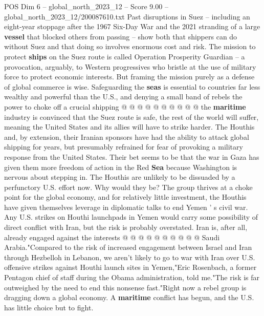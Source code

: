\begin{textsample}{POS Dim 6 – global\_north\_2023\_12 – Score 9.00 – global\_north\_2023\_12/200087610.txt}
Past disruptions in Suez -- including an eight-year stoppage after the 1967 Six-Day War and the 2021 stranding of a large \textbf{vessel} that blocked others from passing -- show both that shippers can do without Suez and that doing so involves enormous cost and risk.
The mission to protect \textbf{ships} on the Suez route is called Operation Prosperity Guardian -- a provocation, arguably, to Western progressives who bristle at the use of military force to protect economic interests.
But framing the mission purely as a defense of global commerce is wise.
Safeguarding the \textbf{seas} is essential to countries far less wealthy and powerful than the U.S., and denying a small band of rebels the power to choke off a crucial shipping @ @ @ @ @ @ @ @ @ @ the \textbf{maritime} industry is convinced that the Suez route is safe, the rest of the world will suffer, meaning the United States and its allies will have to strike harder.
The Houthis and, by extension, their Iranian sponsors have had the ability to attack global shipping for years, but presumably refrained for fear of provoking a military response from the United States.
Their bet seems to be that the war in Gaza has given them more freedom of action in the Red \textbf{Sea} because Washington is nervous about stepping in.
The Houthis are unlikely to be dissuaded by a perfunctory U.S. effort now.
Why would they be?
The group thrives at a choke point for the global economy, and for relatively little investment, the Houthis have given themselves leverage in diplomatic talks to end Yemen ' s civil war.
Any U.S. strikes on Houthi launchpads in Yemen would carry some possibility of direct conflict with Iran, but the risk is probably overstated.
Iran is, after all, already engaged against the interests @ @ @ @ @ @ @ @ @ @ Saudi Arabia."Compared to the risk of increased engagement between Israel and Iran through Hezbelloh in Lebanon, we aren't likely to go to war with Iran over U.S. offensive strikes against Houthi launch sites in Yemen,"Eric Rosenbach, a former Pentagon chief of staff during the Obama administration, told me."The risk is far outweighed by the need to end this nonsense fast."Right now a rebel group is dragging down a global economy.
A \textbf{maritime} conflict has begun, and the U.S. has little choice but to fight.

\end{textsample}
